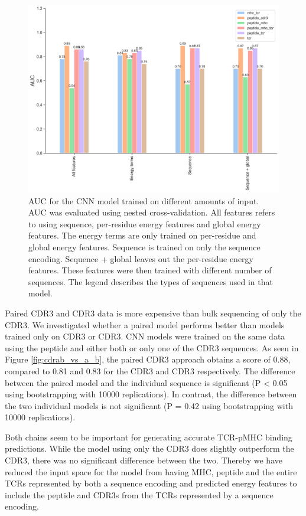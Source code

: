 \begin{figure}[H]
    \centering
    \includegraphics[width=\linewidth]{figures/reduce_input.png}
    \caption{AUC for the CNN model trained on different amounts of input. AUC was evaluated using nested cross-validation. All features refers to using sequence, per-residue energy features and global energy features. The energy terms are only trained on per-residue and global energy features. Sequence is trained on only the sequence encoding. Sequence + global leaves out the per-residue energy features. These features were then trained with different number of sequences. The legend describes the types of sequences used in that model.}
    \label{fig:reduce_input}
\end{figure}

Paired CDR3{\textalpha} and CDR3{\textbeta} data is more expensive than bulk sequencing of only the CDR3{\textbeta}. We investigated whether a paired model performs better than models trained only on CDR3{\textalpha} or CDR3{\textbeta}. CNN models were trained on the same data using the peptide and either both or only one of the CDR3 sequences. As seen in Figure \ref{fig:cdrab_vs_a_b}, the paired CDR3 approach obtains a score of 0.88, compared to 0.81 and 0.83 for the CDR3{\textalpha} and CDR3{\textbeta} respectively. The difference between the paired model and the individual sequence is significant (P < 0.05 using bootstrapping with 10000 replications). In contrast, the difference between the two individual models is not significant (P = 0.42 using bootstrapping with 10000 replications). 

Both chains seem to be important for generating accurate TCR-pMHC binding predictions. While the model using only the CDR3{\textbeta} does slightly outperform the CDR3{\textalpha}, there was no significant difference between the two. Thereby we have reduced the input space for the model from having MHC, peptide and the entire TCRs represented by both a sequence encoding and predicted energy features to include the peptide and CDR3s from the TCRs represented by a sequence encoding.

